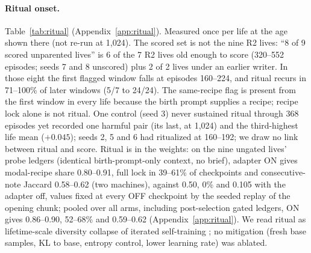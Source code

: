 \documentclass{article}
\begin{document}
\paragraph{Ritual onset.} Table~\ref{tab:ritual} (Appendix~\ref{app:ritual}). Measured once per life at the age shown there (not re-run at 1{,}024). The scored set is not the nine R2 lives: ``8 of 9 scored unparented lives'' is 6 of the 7 R2 lives old enough to score (320--552 episodes; seeds 7 and 8 unscored) plus 2 of 2 lives under an earlier writer. In those eight the first flagged window falls at episodes 160--224, and ritual recurs in 71--100\% of later windows (5/7 to 24/24). The same-recipe flag is present from the first window in every life because the birth prompt supplies a recipe; recipe lock alone is not ritual. One control (seed 3) never sustained ritual through 368 episodes yet recorded one harmful pair (its last, at 1{,}024) and the third-highest life mean ($+0.045$); seeds 2, 5 and 6 had ritualized at 160--192; we draw no link between ritual and score. Ritual is in the weights: on the nine ungated lives' probe ledgers (identical birth-prompt-only context, no brief), adapter ON gives modal-recipe share 0.80--0.91, full lock in 39--61\% of checkpoints and consecutive-note Jaccard 0.58--0.62 (two machines), against 0.50, 0\% and 0.105 with the adapter off, values fixed at every OFF checkpoint by the seeded replay of the opening chunk; pooled over all arms, including post-selection gated ledgers, ON gives 0.86--0.90, 52--68\% and 0.59--0.62 (Appendix~\ref{app:ritual}). We read ritual as lifetime-scale diversity collapse of iterated self-training \citep{shumailov2024collapse,alemohammad2023mad}; no mitigation (fresh base samples, KL to base, entropy control, lower learning rate) was ablated.

\end{document}
